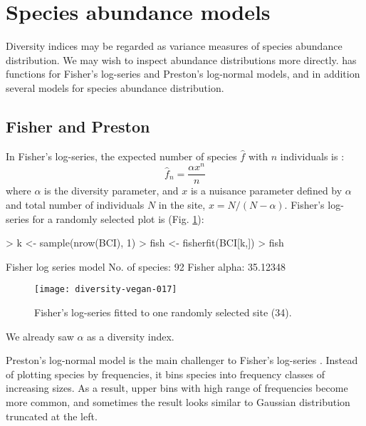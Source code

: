 \documentclass[a4paper,10pt,twocolumn]{article}
\begin{document}
\section{Species abundance models}

Diversity indices may be regarded as variance measures of species
abundance distribution.  We may wish to inspect abundance
distributions more directly.   has functions for
Fisher's log-series and Preston's log-normal models, and in addition
several models for species abundance distribution.

\subsection{Fisher and Preston}

In Fisher's log-series, the expected number of species $\hat f$ with $n$
individuals is \citep{FisherEtal43}:
\begin{equation}
\hat f_n = \frac{\alpha x^n}{n}
\end{equation}
where $\alpha$ is the diversity parameter, and $x$ is a nuisance
parameter defined by $\alpha$ and total number
of individuals $N$ in the site, $x = N/(N-\alpha)$.  Fisher's
log-series for a randomly selected plot is (Fig. \ref{fig:fisher}):
\begin{Schunk}
\begin{Sinput}
> k <- sample(nrow(BCI), 1)
> fish <- fisherfit(BCI[k,])
> fish
\end{Sinput}
\begin{Soutput}
Fisher log series model
No. of species: 92 
Fisher alpha:   35.12348 
\end{Soutput}
\end{Schunk}
\begin{figure}
\texttt{[image: diversity-vegan-017]}
\caption{Fisher's log-series fitted to one randomly selected site
  (34).}
\label{fig:fisher}
\end{figure}
We already saw $\alpha$ as a diversity index.

Preston's log-normal model is the main challenger to Fisher's
log-series \citep{Preston48}.  Instead of plotting species by
frequencies, it bins species into frequency classes of increasing
sizes.  As a result, upper bins with high range of frequencies become
more common, and sometimes the result looks similar to Gaussian
distribution truncated at the left.
\end{document}
